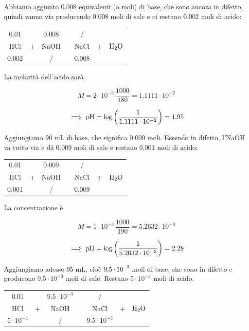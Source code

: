 Abbiamo aggiunto 0.008 equivalenti (o moli) di base, che sono ancora in difetto, quindi vanno via producendo 0.008 moli di sale e ci restano 0.002 moli di acido:

\begin{center}
    \begin{tabular}{ccccccc}
        0.01 &  & 0.008 & & / & &\\
        HCl & + & NaOH & \ce{->} & NaCl & + & $\rm H_2O$\\
        0.002 &  &  / & & 0.008 & &\\
    \end{tabular}
\end{center}

La molarità dell'acido sarà

$$M=2 \cdot 10^{-3} \, \frac{1000}{180}=1.1111 \cdot 10^{-2}$$

$$\implies \rm pH = \log \left( \frac{1}{1.1111 \cdot 10^{-2}} \right)=1.95$$


Aggiungiamo 90 mL di base, che significa 0.009 moli. Essendo in difetto, l'NaOH va tutto via e dà 0.009 moli di sale e restano 0.001 moli di acido:

\begin{center}
    \begin{tabular}{ccccccc}
        0.01 &  & 0.009 & & / & &\\
        HCl & + & NaOH & \ce{->} & NaCl & + & $\rm H_2O$\\
        0.001 &  &  / & & 0.009 & &\\
    \end{tabular}
\end{center}

La concentrazione è

$$M=1 \cdot 10^{-3} \, \frac{1000}{190}=5.2632 \cdot 10^{-3}$$

$$\implies \rm pH = \log \left( \frac{1}{5.2632 \cdot 10^{-3}} \right)=2.28$$

Aggiungiamo adesso 95 mL, cioè $9.5 \cdot 10^{-3}$ moli di base, che sono in difetto e producono $9.5 \cdot 10^{-3}$ moli di sale. Restano $5 \cdot 10^{-4}$ moli di acido.

\begin{center}
    \begin{tabular}{ccccccc}
        0.01 &  & $9.5 \cdot 10^{-3}$  & & / & &\\
        HCl & + & NaOH & \ce{->} & NaCl & + & $\rm H_2O$\\
        $5 \cdot 10^{-4}$ &  &  / & & $9.5 \cdot 10^{-3}$ & &\\
    \end{tabular}
\end{center}

